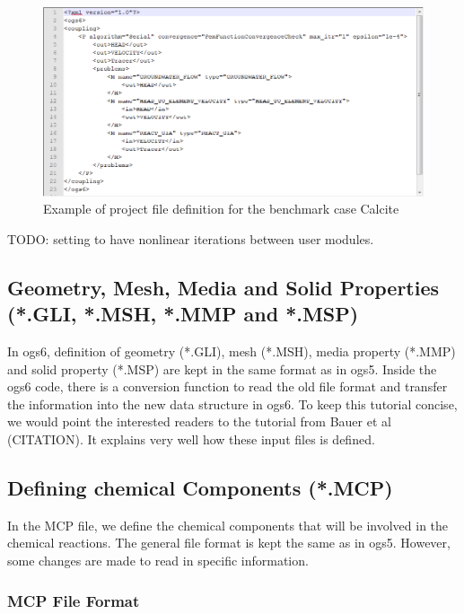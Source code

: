 \begin{figure}
\includegraphics[width=\textwidth]{RT/figs/RT_fig_pro_file}
\caption{Example of project file definition for the benchmark case Calcite}
\label{fig:RT_pro_file}
\end{figure}

TODO: setting to have nonlinear iterations between user modules. 


\subsection{Geometry, Mesh, Media and Solid Properties (*.GLI, *.MSH, *.MMP and *.MSP)}

In ogs6, definition of geometry (*.GLI), mesh (*.MSH), media property (*.MMP) and solid property (*.MSP) are kept in the same format as in ogs5. Inside the ogs6 code, there is a conversion function to read the old file format and transfer the information into the new data structure in ogs6. To keep this tutorial concise, we would point the interested readers to the tutorial from Bauer et al (CITATION). It explains very well how these input files is defined. 

\subsection{Defining chemical Components (*.MCP)}

In the MCP file, we define the chemical components that will be involved in the chemical reactions. The general file format is kept the same as in ogs5. However, some changes are made to read in specific information. 

\subsubsection{MCP File Format}

